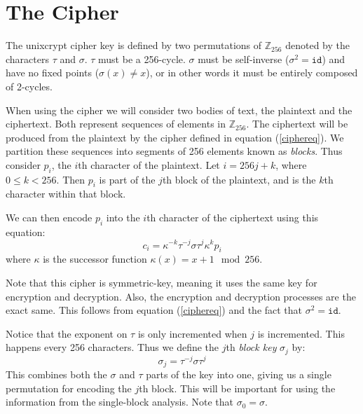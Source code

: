 \documentclass[12pt]{article}
\newcommand{\bytes}{\mathbb{Z}_{256}}
\theoremstyle{definition}
\theoremstyle{remark}
\theoremstyle{remark}
\begin{document}
\section{The Cipher}
\par
The unixcrypt cipher key is defined by two permutations of $\bytes$ denoted by the characters $\tau$ and $\sigma$. $\tau$ must be a 256-cycle. $\sigma$ must be self-inverse ($\sigma^2=\texttt{id}$) and have no fixed points ($\sigma(x)\neq x$), or in other words it must be entirely composed of 2-cycles.


\par
When using the cipher we will consider two bodies of text, the plaintext and the ciphertext. Both represent sequences of elements in $\bytes$. The ciphertext will be produced from the plaintext by the cipher defined in equation (\ref{ciphereq}). We partition these sequences into segments of 256 elements known as \emph{blocks}. Thus consider $p_i$, the $i$th character of the plaintext. Let $i=256 j + k$, where $0\leq k < 256$. Then $p_i$ is part of the $j$th block of the plaintext, and is the $k$th character within that block.

\par We can then encode $p_i$ into the $i$th character of the ciphertext using this equation:
\begin{equation}
	\label{ciphereq}
	c_i = \kappa^{-k} \tau^{-j} \sigma \tau^j \kappa^k p_i
\end{equation}
where $\kappa$ is the successor function $\kappa(x)=x+1\mod 256 $.


\par
Note that this cipher is symmetric-key, meaning it uses the same key for encryption and decryption. Also, the encryption and decryption processes are the exact same. This follows from equation (\ref{ciphereq}) and the fact that $\sigma^2=\texttt{id}$.

\par
Notice that the exponent on $\tau$ is only incremented when $j$ is incremented. This happens every 256 characters. Thus we define the $j$th \emph{block key} $\sigma_j$ by:
\begin{equation}
		\label{blockeq}
		\sigma_j = \tau^{-j} \sigma \tau^j
\end{equation}
This combines both the $\sigma$ and $\tau$ parts of the key into one, giving us a single permutation for encoding the $j$th block. This will be important for using the information from the single-block analysis. Note that $\sigma_0 = \sigma$.
\end{document}
